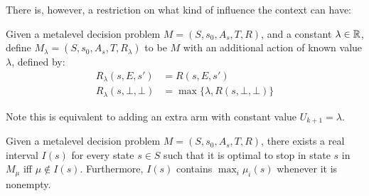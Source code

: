 There is, however, a restriction on what kind of influence the context can have:

\begin{dfn}\label{dfn:context}
	Given a metalevel decision problem $M=(S,s_0,A_s,T,R)$, and a constant $\lambda\in\mathbb{R}$,
	define $M_\lambda = (S,s_0,A_s,T,R_\lambda)$ to be $M$ with an additional action of known 
	value $\lambda$, defined by:
	\begin{align*}
		R_\lambda(s,E,s')      &= R(s,E,s') \\
		R_\lambda(s,\bot,\bot) &= \max\{\lambda, R(s,\bot,\bot)\}
	\end{align*}
\end{dfn}

Note this is equivalent to adding an extra arm with constant value $U_{k+1}=\lambda$.

\begin{thm}
	Given a metalevel decision problem $M=(S,s_0,A_s,T,R)$, 
	there exists a real interval $I(s)$ for every state $s\in S$ such that
	it is optimal to stop in state $s$ in $M_\mu$ iff $\mu\notin I(s)$.
	Furthermore, $I(s)$ contains $\max_i\mu_i(s)$ whenever it is nonempty.
\end{thm}

